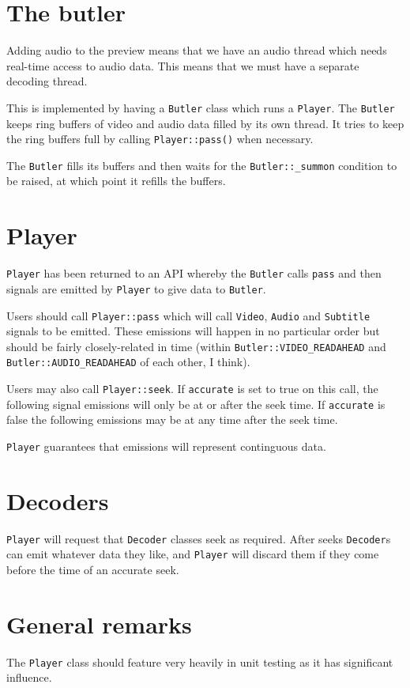 \documentclass{article}
\renewcommand{\c}[1]{\texttt{#1}}
\begin{document}
\section{The butler}

Adding audio to the preview means that we have an audio thread which
needs real-time access to audio data.  This means that we must have a
separate decoding thread.

This is implemented by having a \c{Butler} class which runs a
\c{Player}.  The \c{Butler} keeps ring buffers of video and
audio data filled by its own thread.  It tries to keep the ring
buffers full by calling \c{Player::pass()} when necessary.

The \c{Butler} fills its buffers and then waits for the
\c{Butler::\_summon} condition to be raised, at which point it
refills the buffers.

\section{Player}

\c{Player} has been returned to an API whereby the \c{Butler} calls
\c{pass} and then signals are emitted by \c{Player} to give data to \c{Butler}.

Users should call \c{Player::pass} which will call \c{Video},
\c{Audio} and \c{Subtitle} signals to be emitted.  These emissions
will happen in no particular order but should be fairly
closely-related in time (within \c{Butler::VIDEO\_READAHEAD} and
\c{Butler::AUDIO\_READAHEAD} of each other, I think).

Users may also call \c{Player::seek}.  If \c{accurate} is set to true
on this call, the following signal emissions will only be at or
after the seek time.  If \c{accurate} is false the following
emissions may be at any time after the seek time.

\c{Player} guarantees that emissions will represent continguous data.

\section{Decoders}

\c{Player} will request that \c{Decoder} classes seek as required.
After seeks \c{Decoder}s can emit whatever data they like, and
\c{Player} will discard them if they come before the time of an accurate
seek.

\section{General remarks}

The \c{Player} class should feature very heavily in unit testing as it
has significant influence.
\end{document}
